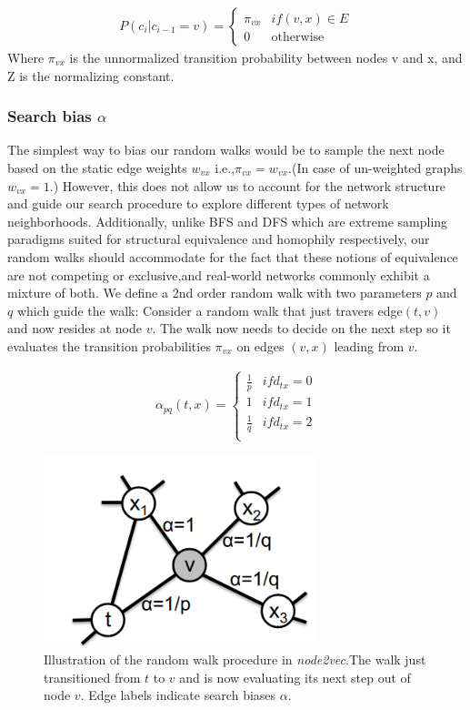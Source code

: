 \documentclass[12pt,a4paper]{article}
\begin{document}
\begin{align*}
P(c_{i} | c_{i-1}=v) = \begin{cases} 
\pi_{vx} & if (v,x) \in E \\
0 & \text{otherwise}
\end{cases}
\end{align*}
Where $\pi_{vx}$ is the unnormalized transition probability between nodes v and x, and Z is the normalizing constant.

\subsubsection*{Search bias $\alpha$}

The simplest way to bias our random walks would be to sample the next node based on the static edge weights $w_{vx}$ i.e.,$\pi_{vx}=w_{vx}$.(In  case  of  un-weighted  graphs $w_{vx}= 1$.)   However,  this  does not  allow  us  to  account  for  the  network  structure  and  guide  our search procedure to explore different types of network neighborhoods. Additionally, unlike BFS and DFS which are extreme sampling paradigms suited for structural equivalence and homophily respectively,  our random walks should accommodate for the fact that these notions of equivalence are not competing or exclusive,and real-world networks commonly exhibit a mixture of both. We define a 2nd order random walk with two parameters $p$ and $q$ which guide the walk:  Consider a random walk that just travers edge$(t,v)$ and now resides at node $v$.  The walk now needs to decide on the next step so it evaluates the transition probabilities $\pi_{vx}$ on edges $(v,x)$ leading from $v$. 

\begin{align*}
\alpha_{pq}(t,x) = 
\begin{cases}
\frac{1}{p} & if d_{tx}=0 \\
1 & if d_{tx}=1 \\
\frac{1}{q} & if d_{tx}=2 \\
\end{cases}
\end{align*}

\begin{figure}[h]
\includegraphics[width=8cm]{node2vecPic}
\centering
\caption{Illustration of the random walk procedure in \textit{node2vec}.The walk just transitioned from $t$ to $v$ and is now evaluating its next step out of node $v$. Edge labels indicate search biases $\alpha$.}
\end{figure}
\end{document}
